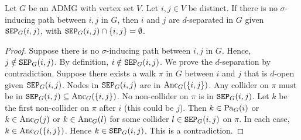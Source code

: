 \begin{Prp}
  Let $G$ be an ADMG with vertex set $V$.
  Let $i,j \in V$ be distinct.
  If there is no $\sigma$-inducing path between $i,j$ in $G$, then $i$ and $j$ are $d$-separated in $G$ given $\mathtt{SEP}_G(i,j)$,
  with $\mathtt{SEP}_G(i,j) \cap \{i,j\} = \emptyset$.
\end{Prp}
\begin{proof}
  Suppose there is no $\sigma$-inducing path between $i,j$ in $G$.
  Hence, $j \notin \mathtt{SEP}_G(i,j)$.
  By definition, $i \notin \mathtt{SEP}_G(i,j)$.
  We prove the $d$-separation by contradiction.
  Suppose there exists a walk $\pi$ in $G$ between $i$ and $j$ that is $d$-open given $\mathtt{SEP}_G(i,j)$.
  Nodes in $\mathtt{SEP}_G(i,j)$ are in $\mathrm{Anc}_G(\{i,j\})$.
  Any collider on $\pi$ must be in $\mathtt{SEP}_G(i,j) \subseteq \mathrm{Anc}_G(\{i,j\})$.
  No non-collider on $\pi$ is in $\mathtt{SEP}_G(i,j)$.
  Let $k$ be the first non-collider on $\pi$ after $i$ (this could be $j$).
  Then $k \in \mathrm{Pa}_G(i)$ or $k \in \mathrm{Anc}_G(j)$ or $k \in \mathrm{Anc}_G(l)$ for some collider $l \in \mathtt{SEP}_G(i,j)$ on $\pi$.
  In each case, $k \in \mathrm{Anc}_G(\{i,j\})$.
  Hence $k \in \mathtt{SEP}_G(i,j)$.
  This is a contradiction.
\end{proof}
